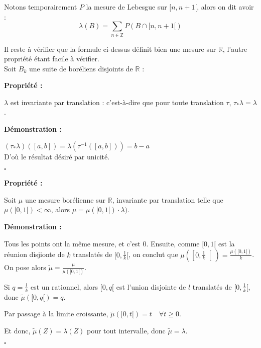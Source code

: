 \documentclass[10pt,a4paper,notitlepage ]{report}
\newcommand{\R}{\mathbb R}
\newcommand{\1}{\mathds 1}
\newcounter{th}
\newenvironment{propriete}[1][]{
	\begin{tcolorbox}
		\textbf{Propriété #1 : }
}
{\end{tcolorbox}}
\newenvironment{demo}[1][]{

	\textbf{Démonstration #1 :}
}{\begin{flushright}
	$\square$
\end{flushright}
}
\begin{document}
Notons temporairement $P$ la mesure de Lebesgue sur $[n , n+1 [ $, alors on dit avoir :
\begin{equation*}
\lambda (B) = \sum \limits_{n \in \mathbb{Z} }P (B \cap [n, n+1[ )
\end{equation*}


Il reste à vérifier que la formule ci-dessus définit bien une mesure sur $\R$, l'autre propriété étant facile à vérifier. \\

Soit $B_k $ une suite de boréliens disjoints de $\R$ : 

\begin{propriete}

$\lambda$ est invariante par translation : c'est-à-dire que pour toute translation $\tau$, $\tau _* \lambda = \lambda $. 

\end{propriete}

\begin{demo}

$\left( \tau _* \lambda \right) \left( [a,b] \right)  = \lambda \left( \tau^{-1}  \left( [a,b] \right) \right) = b-a $ \\

D'où le résultat désiré par unicité.

\end{demo}

\begin{propriete}

Soit $\mu $ une mesure borélienne sur $\R$, invariante par translation telle que $\mu ([0,1[ )< \infty $, alors $\mu = \mu ([0,1[ ) \cdot \lambda )$.

\end{propriete}

\begin{demo}
	Tous les points ont la même mesure, et c'est $0$. Ensuite, comme $[0,1[$ est la réunion disjionte de $k$ translatés de $[0,\frac 1 k[$, on conclut que $\mu\left(\left[0, \frac 1 k\right[\right) = \frac{\mu([0,1[)}{k}$. On pose alors $\tilde \mu = \frac \mu {\mu([0,1[)}$.
	
	Si $q=\frac l k$ est un rationnel, alors $[0,q[$ est l'union disjointe de $l$ translatés de $[0,\frac 1 k[$, donc $\tilde\mu([0,q[)= q$.
	
	Par passage à la limite croissante, $\tilde\mu([0,t[) = t \quad \forall t \ge 0$.
	
	Et donc, $\tilde\mu(Z)=\lambda(Z)$ pour tout intervalle, donc $\tilde\mu=\lambda$.
\end{demo}
\end{document}
